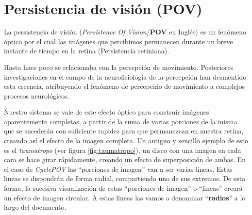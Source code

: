 \chapter{Persistencia de visión (POV)}
\label{chap:persistenciaDeVision}

La persistencia de visión (\textsl{Persistence Of Vision}/\textbf{POV} en
Inglés) es un fenómeno óptico por el cual las imágenes que percibimos permanecen
durante un breve instante de tiempo en la retina (Persistencia retiniana).

Hasta hace poco se relacionaba con la percepción de movimiento. Posteriores
investigaciones en el campo de la neurofisiología de la percepción han
desmentido esta creencia, atribuyendo el fenómeno de percepcińo de movimiento a
complejos procesos neurológicos.

\label{def:radios}
Nuestro sistema se vale de este efecto óptico para construir imágenes
aparentemente completas, a partir de la suma de varias porciones de la misma
que se sucederán con suficiente rapidez para que permanezcan en nuestra
retina, creando así el efecto de la imagen completa. Un antiguo y sencillo
ejemplo de esto es el \textsl{taumatropo} (ver figura \ref{fig:taumatropo}), un
disco con una imagen en cada cara se hace girar rápidamente, creando un efecto
de superposición de ambas. En el caso de \textsl{CyclePOV} las ``porciones de
imagen'' van a ser varias lineas. Estas lineas se dispondrán de forma radial,
compartiendo uno de sus extremos. De esta forma, la sucesiva visualización de
estas ``porciones de imagen'' o ``lineas'' creará un efecto de imagen circular.
A estas lineas las vamos a denominar ``\textbf{radios}'' a lo largo del
documento.

